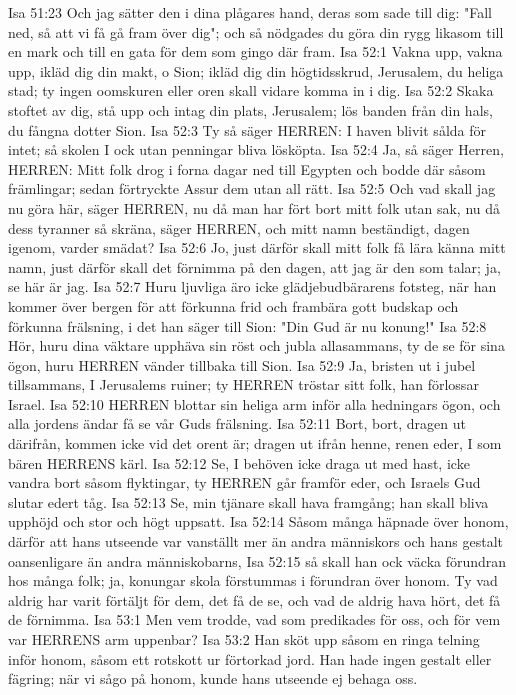 Isa 51:23  Och jag sätter den i dina plågares hand, deras som sade till dig: "Fall ned, så att vi få gå fram över dig"; och så nödgades du göra din rygg likasom till en mark och till en gata för dem som gingo där fram.
Isa 52:1  Vakna upp, vakna upp, ikläd dig din makt, o Sion; ikläd dig din högtidsskrud, Jerusalem, du heliga stad; ty ingen oomskuren eller oren skall vidare komma in i dig.
Isa 52:2  Skaka stoftet av dig, stå upp och intag din plats, Jerusalem; lös banden från din hals, du fångna dotter Sion.
Isa 52:3  Ty så säger HERREN: I haven blivit sålda för intet; så skolen I ock utan penningar bliva lösköpta.
Isa 52:4  Ja, så säger Herren, HERREN: Mitt folk drog i forna dagar ned till Egypten och bodde där såsom främlingar; sedan förtryckte Assur dem utan all rätt.
Isa 52:5  Och vad skall jag nu göra här, säger HERREN, nu då man har fört bort mitt folk utan sak, nu då dess tyranner så skräna, säger HERREN, och mitt namn beständigt, dagen igenom, varder smädat?
Isa 52:6  Jo, just därför skall mitt folk få lära känna mitt namn, just därför skall det förnimma på den dagen, att jag är den som talar; ja, se här är jag.
Isa 52:7  Huru ljuvliga äro icke glädjebudbärarens fotsteg, när han kommer över bergen för att förkunna frid och frambära gott budskap och förkunna frälsning, i det han säger till Sion: "Din Gud är nu konung!"
Isa 52:8  Hör, huru dina väktare upphäva sin röst och jubla allasammans, ty de se för sina ögon, huru HERREN vänder tillbaka till Sion.
Isa 52:9  Ja, bristen ut i jubel tillsammans, I Jerusalems ruiner; ty HERREN tröstar sitt folk, han förlossar Israel.
Isa 52:10  HERREN blottar sin heliga arm inför alla hedningars ögon, och alla jordens ändar få se vår Guds frälsning.
Isa 52:11  Bort, bort, dragen ut därifrån, kommen icke vid det orent är; dragen ut ifrån henne, renen eder, I som bären HERRENS kärl.
Isa 52:12  Se, I behöven icke draga ut med hast, icke vandra bort såsom flyktingar, ty HERREN går framför eder, och Israels Gud slutar edert tåg.
Isa 52:13  Se, min tjänare skall hava framgång; han skall bliva upphöjd och stor och högt uppsatt.
Isa 52:14  Såsom många häpnade över honom, därför att hans utseende var vanställt mer än andra människors och hans gestalt oansenligare än andra människobarns,
Isa 52:15  så skall han ock väcka förundran hos många folk; ja, konungar skola förstummas i förundran över honom. Ty vad aldrig har varit förtäljt för dem, det få de se, och vad de aldrig hava hört, det få de förnimma.
Isa 53:1  Men vem trodde, vad som predikades för oss, och för vem var HERRENS arm uppenbar?
Isa 53:2  Han sköt upp såsom en ringa telning inför honom, såsom ett rotskott ur förtorkad jord. Han hade ingen gestalt eller fägring; när vi sågo på honom, kunde hans utseende ej behaga oss.
